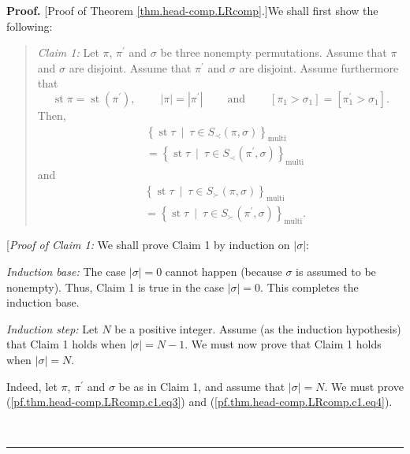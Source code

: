 \documentclass[numbers=enddot,12pt,final,onecolumn,notitlepage]{scrartcl}%
\theoremstyle{definition}
\newenvironment{statement}{\begin{quote}}{\end{quote}}
\newenvironment{proof}[1][Proof]{\noindent\textbf{#1.} }{\ \rule{0.5em}{0.5em}}
\begin{document}
\begin{proof}
[Proof of Theorem \ref{thm.head-comp.LRcomp}.]We shall first show the following:

\begin{statement}
\textit{Claim 1:} Let $\pi$, $\pi^{\prime}$ and $\sigma$ be three nonempty
permutations. Assume that $\pi$ and $\sigma$ are disjoint. Assume that
$\pi^{\prime}$ and $\sigma$ are disjoint. Assume furthermore that%
\[
\operatorname{st} \pi   =\operatorname{st}\left(  \pi^{\prime
}\right)  ,\ \ \ \ \ \ \ \ \ \ \left\vert \pi\right\vert =\left\vert
\pi^{\prime}\right\vert \ \ \ \ \ \ \ \ \ \ \text{and}%
\ \ \ \ \ \ \ \ \ \ \left[  \pi_{1}>\sigma_{1}\right]  =\left[  \pi
_{1}^{\prime}>\sigma_{1}\right]  .
\]
Then,
\begin{align}
&  \left\{  \operatorname{st} \tau   \ \mid\ \tau\in S_{\prec
}\left(  \pi,\sigma\right)  \right\}  _{\operatorname*{multi}}\nonumber\\
&  =\left\{  \operatorname{st} \tau   \ \mid\ \tau\in S_{\prec
}\left(  \pi^{\prime},\sigma\right)  \right\}  _{\operatorname*{multi}}
\label{pf.thm.head-comp.LRcomp.c1.eq3}%
\end{align}
and%
\begin{align}
&  \left\{  \operatorname{st} \tau   \ \mid\ \tau\in S_{\succ
}\left(  \pi,\sigma\right)  \right\}  _{\operatorname*{multi}}\nonumber\\
&  =\left\{  \operatorname{st} \tau   \ \mid\ \tau\in S_{\succ
}\left(  \pi^{\prime},\sigma\right)  \right\}  _{\operatorname*{multi}}.
\label{pf.thm.head-comp.LRcomp.c1.eq4}%
\end{align}

\end{statement}

[\textit{Proof of Claim 1:} We shall prove Claim 1 by induction on $\left\vert
\sigma\right\vert $:

\textit{Induction base:} The case $\left\vert \sigma\right\vert =0$ cannot
happen (because $\sigma$ is assumed to be nonempty). Thus, Claim 1 is true in
the case $\left\vert \sigma\right\vert =0$. This completes the induction base.

\textit{Induction step:} Let $N$ be a positive integer. Assume (as the
induction hypothesis) that Claim 1 holds when $\left\vert \sigma\right\vert
=N-1$. We must now prove that Claim 1 holds when $\left\vert \sigma\right\vert
=N$.

Indeed, let $\pi$, $\pi^{\prime}$ and $\sigma$ be as in Claim 1, and assume
that $\left\vert \sigma\right\vert =N$. We must prove
(\ref{pf.thm.head-comp.LRcomp.c1.eq3}) and
(\ref{pf.thm.head-comp.LRcomp.c1.eq4}).


\end{proof}
\end{document}
